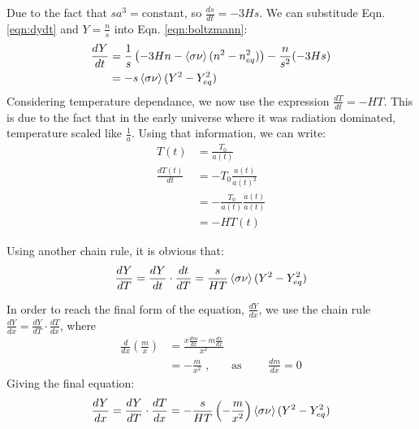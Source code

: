 \documentclass[12pt]{article}
\begin{document}
Due to the fact that $sa^3 = \text{constant}$, so $\frac{ds}{dt} = -3Hs$. We can substitude Eqn. \ref{eqn:dydt} and $Y = \frac{n}{s}$ into Eqn. \ref{eqn:boltzmann}:
\begin{equation}
    \begin{split}
        \frac{dY}{dt} &= \frac{1}{s}\left(-3Hn - \braket{\sigma\nu}(n^2 - n^2_{eq})\right) - \frac{n}{s^2}(-3Hs)
        \\&= -s\braket{\sigma\nu}(Y^2 - Y^2_{eq})
    \end{split}
\end{equation}
Considering temperature dependance, we now use the expression $\frac{dT}{dt} = -HT$. This is due to the fact that in the early universe where it was radiation dominated, temperature scaled like $\frac{1}{a}$. Using that information, we can write:
\begin{equation}
    \begin{split}
            T(t) &= \frac{T_0}{a(t)}
            \\ \frac{dT(t)}{dt} &= -T_0\frac{\dot a(t)}{a(t)^2}
            \\ &= -\frac{T_0}{a(t)}\frac{\dot a(t)}{a(t)}
            \\ &= -HT(t)
    \end{split}
\end{equation}

Using another chain rule, it is obvious that:
\begin{equation}
    \frac{dY}{dT} = \frac{dY}{dt}\cdot\frac{dt}{dT} = \frac{s}{HT}\braket{\sigma\nu}(Y^2 - Y^2_{eq})
\end{equation}

In order to reach the final form of the equation, $\frac{dY}{dx}$, we use the chain rule $\frac{dY}{dx} = \frac{dY}{dT}\cdot\frac{dT}{dx}$, where 
\begin{equation}
    \begin{split}
        \frac{d}{dx}\left(\frac{m}{x}\right) &= \frac{x\frac{dm}{dx} - m\frac{dx}{dx}}{x^2} 
        \\ &= -\frac{m}{x^2} \text{ ,}\qquad \text{as }\qquad \frac{dm}{dx}= 0
    \end{split}
\end{equation}
Giving the final equation:
\begin{equation}
        \frac{dY}{dx} = \frac{dY}{dT}\cdot\frac{dT}{dx} = -\frac{s}{HT}\left(-\frac{m}{x^2}\right)\braket{\sigma\nu}(Y^2 - Y^2_{eq})
\end{equation}
\end{document}
